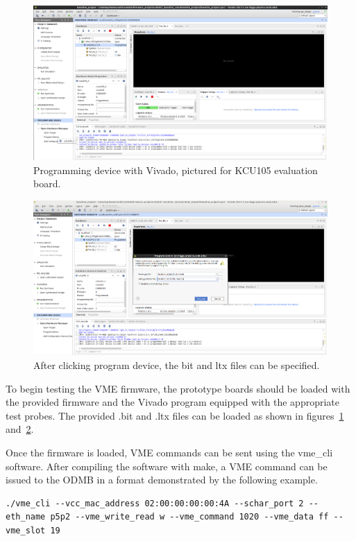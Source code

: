\documentclass[10pt,a4paper]{article}
\begin{document}
\begin{figure}[H]
\centering
\includegraphics[width= 0.75 \textwidth]{figures/program_step1.png}
\caption{Programming device with Vivado, pictured for KCU105 evaluation board.}
\label{fig:programmingstep1}
\end{figure}

\begin{figure}[H]
\centering
\includegraphics[width= 0.75 \textwidth]{figures/program_step2.png}
\caption{After clicking program device, the bit and ltx files can be specified.}
\label{fig:programmingstep2}
\end{figure}

To begin testing the VME firmware, the prototype boards should be loaded with the provided firmware and the Vivado program equipped with the appropriate test probes. The provided .bit and .ltx files can be loaded as shown in figures~\ref{fig:programmingstep1} and~\ref{fig:programmingstep2}. 

Once the firmware is loaded, VME commands can be sent using the vme\_cli software. After compiling the software with make, a VME command can be issued to the ODMB in a format demonstrated by the following example.

\begin{lstlisting}[label={lst:vmecli}]
./vme_cli --vcc_mac_address 02:00:00:00:00:4A --schar_port 2 --eth_name p5p2 --vme_write_read w --vme_command 1020 --vme_data ff --vme_slot 19
\end{lstlisting}
\end{document}
